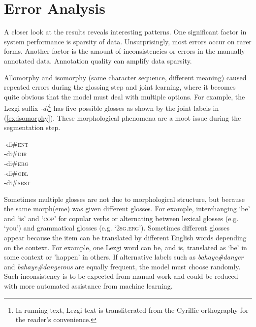 




\section{Error Analysis}
\label{sec:errors}

A closer look at the results reveals interesting patterns. One significant factor in system performance is sparsity of data. Unsurprisingly, most errors occur on rarer forms. 
Another factor is the amount of inconsistencies or errors in the manually annotated data. Annotation quality can amplify data sparsity. 

Allomorphy and isomorphy (same character sequence, different meaning) caused repeated errors during the glossing step and joint learning, where it becomes quite obvious that the model must deal with multiple options. For example, the Lezgi suffix \textit{-di}\footnote{In running text, Lezgi text is transliterated from the Cyrillic orthography for the reader's convenience.} has five possible glosses as shown by the joint labels in (\ref{ex:isomorphy}). These morphological phenomena are a moot issue during the segmentation step. 

\pex   
\label{ex:isomorphy}
-di\#\textsc{ent} \\
-di\#\textsc{dir} \\
-di\#\textsc{erg} \\
-di\#\textsc{obl} \\
-di\#\textsc{sbst} 
\xe

Sometimes multiple glosses are not due to morphological structure, but because the same morph(eme) was given different glosses. For example, interchanging `be' and `is' and `\textsc{cop}' for copular verbs or alternating between lexical glosses (e.g. `you') and grammatical glosses (e.g. `\textsc{2sg.erg}'). Sometimes different glosses appear because the item can be translated by different English words depending on the context. For example, one Lezgi word can be, and is, translated as `be' in some context or 'happen' in others. If alternative labels such as \textit{bahaye\#danger} and \textit{bahaye\#dangerous} are equally frequent, the model must choose randomly. Such inconsistency is to be expected from manual work and could be reduced with more automated assistance from machine learning.

